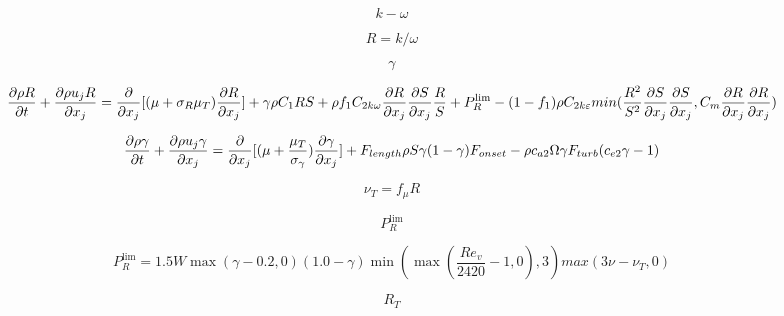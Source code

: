 

\begin{equation}
k-\omega
\end{equation}

\begin{equation}
R = k/\omega
\end{equation}

\begin{equation}
\gamma
\end{equation}

\begin{equation}
        \frac{\partial \rho R}{\partial t}+\frac{\partial \rho 
        u_{j}R}{\partial x_{j}}=\frac{\partial }{\partial x_{j}}\lbrack (\mu 
        +\sigma _{R}\mu _{T})\frac{\partial R}{\partial x_{j}}\rbrack +\gamma 
        \rho C_{1}RS+\rho f_{1}C_{2k\omega }\frac{\partial R}{\partial 
        x_{j}}\frac{\partial S}{\partial x_{j}}\frac{R}{S}+ P^{\lim 
        }_{R}  \\ 
        -(1-f_{1})\rho C_{2k\varepsilon }min(\frac{R^{2}}{S^{2}}\frac{\partial 
        S}{\partial x_{j}}\frac{\partial S}{\partial x_{j}}, C_m\frac{\partial 
        R}{\partial x_{j}}\frac{\partial R}{\partial x_{j}}) 
\end{equation}

\begin{equation}
\frac{\partial \rho \gamma }{\partial t}+\frac{\partial \rho 
        u_{j}\gamma }{\partial x_{j}}=\frac{\partial }{\partial x_{j}}\lbrack 
        (\mu +\frac{\mu _{T}}{\sigma _{\gamma }})\frac{\partial \gamma 
        }{\partial x_{j}}\rbrack +F_{length}\rho S\gamma (1-\gamma 
        )F_{onset} \\ -\rho c_{a2}\Omega \gamma F_{turb}(c_{e2}\gamma -1)
\end{equation}

\begin{equation}
\nu_{T} = f_{\mu}R
\end{equation}

\begin{equation}
P_{R}^{\lim}
\end{equation}

\begin{equation}
P_{R}^{\lim }=1.5W\max (\gamma -0.2, 0)(1.0-\gamma )\min (\max 
(\frac{Re_{v}}{2420}-1, 0), 3)max(3\nu- \nu_{T}, 0)
\end{equation}

\begin{equation}
R_{T}
\end{equation}

